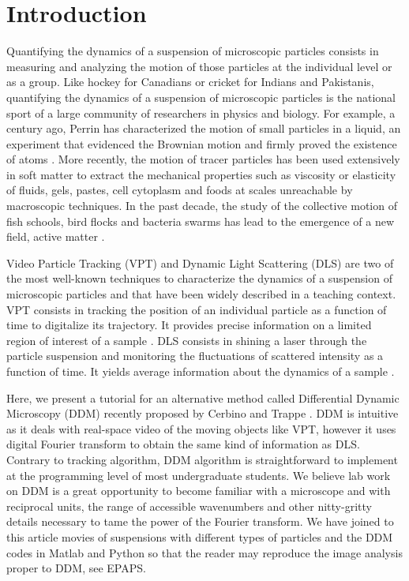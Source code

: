 \documentclass[prb,twocolumn,amsmath,amssymb]{revtex4-1}
\newcommand{\tgn}[1]{{\color{blue}#1}} %
\begin{document}
\section{Introduction}
\label{sec:level1}

Quantifying the dynamics of a suspension of microscopic particles consists in measuring and analyzing the motion of those particles at the individual level or as a group. Like hockey for Canadians or cricket for Indians and Pakistanis, quantifying the dynamics of a suspension of microscopic particles is the national sport of a large community of researchers in physics and biology. For example, a century ago, Perrin has characterized the motion of small particles in a liquid, an experiment that evidenced the Brownian motion and firmly proved the existence of atoms \cite{22_perrin2014atomes}. More recently, the motion of tracer particles has been used extensively in soft matter\cite{pt1990witten, pt1964reiner} to extract the mechanical properties such as viscosity or elasticity of fluids, gels\cite{Mason1997, Chen2010}, pastes, cell cytoplasm\cite{Fabry2001,Lau2003} and foods at scales unreachable by macroscopic techniques. In the past decade, the study of the collective motion of fish schools, bird flocks and bacteria swarms has lead to the emergence of a new field, active matter \cite{Bricard2013}.

Video Particle Tracking (VPT) and Dynamic Light Scattering (DLS) \tgn{are two of the most well-known techniques to characterize} the dynamics of a suspension of microscopic particles and that have been widely described in a teaching context. VPT consists in tracking the position of an individual particle as a function of time to digitalize its trajectory. \tgn{It provides precise information on a limited region of interest of a sample} \citep{Crocker1996,ajp2013catipovic,Maurer2014}. DLS consists in shining a laser through the particle suspension and monitoring the fluctuations of scattered intensity as a function of time\cite{ajp1969clark}. It yields average information about the dynamics of a sample \citep{18_sartor2003dynamic, ajp1999goldburg,ajp1969clark}.

Here, we present a tutorial for an alternative method called Differential Dynamic Microscopy (DDM) recently proposed by Cerbino and Trappe \cite{2_DDM}. DDM is intuitive as it deals with real-space video of the moving objects like VPT, however it uses digital Fourier transform to obtain the same kind of information as DLS.  Contrary to tracking algorithm, DDM algorithm is straightforward to implement at the programming level of most undergraduate students. We believe lab work on DDM is a great opportunity to become familiar with a microscope and with reciprocal units, the range of accessible wavenumbers and other nitty-gritty details necessary to tame the power of the Fourier transform\cite{ajp1976higgins, ajp2001whiford}. We have joined to this article movies of suspensions with different types of particles and the DDM codes in Matlab and Python so that the reader may reproduce the image analysis proper to DDM, see EPAPS.
\end{document}
